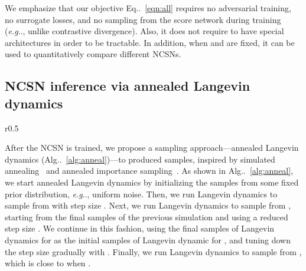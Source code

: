 \documentclass{article}
\makeatletter
\def\@onedot{\ifx\@let@token.\else.\null\fi\xspace}
\DeclareRobustCommand\onedot{\futurelet\@let@token\@onedot}
\newcommand{\eqnref}[1]{Eq\onedot~\eqref{#1}}
\newcommand{\algoref}[1]{Alg\onedot~\ref{#1}}
\def\eg{\emph{e.g}\onedot}
\makeatother
\begin{document}
We emphasize that our objective \eqnref{eqn:all} requires no adversarial training, no surrogate losses, and no sampling from the score network during training (\eg, unlike contrastive divergence). Also, it does not require  to have special architectures in order to be tractable. In addition, when  and  are fixed, it can be used to quantitatively compare different NCSNs.

\subsection{NCSN inference via annealed Langevin dynamics}
\begin{wrapfigure}[15]{r}{0.5\textwidth}
\vspace{-2.2em}
\begin{minipage}{0.5\textwidth}
\begin{algorithm}[H]
	\caption{Annealed Langevin dynamics.}
	\label{alg:anneal}
	\begin{algorithmic}[1]
	        \State{} 
                \State{\resizebox{0.75\textwidth}{!}{}}
            \EndFor
            \State{}
        \EndFor
        \item[]
        \Return{}
	\end{algorithmic}
\end{algorithm}
\end{minipage}
\end{wrapfigure}
After the NCSN  is trained, we propose a sampling approach---annealed Langevin dynamics (\algoref{alg:anneal})---to produced samples, inspired by simulated annealing~\cite{kirkpatrick83optimizationby} and annealed importance sampling~\cite{neal2001annealed}. As shown in \algoref{alg:anneal}, we start annealed Langevin dynamics by initializing the samples from some fixed prior distribution, \eg, uniform noise. Then, we run Langevin dynamics to sample from  with step size . Next, we run Langevin dynamics to sample from , starting from the final samples of the previous simulation and using a reduced step size . We continue in this fashion, using the final samples of Langevin dynamics for  as the initial samples of Langevin dynamic for , and tuning down the step size  gradually with . Finally, we run Langevin dynamics to sample from , which is close to  when .
\end{document}
